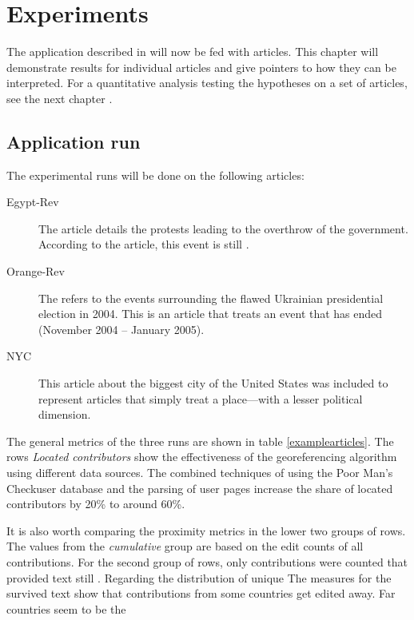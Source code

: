 \chapter{Experiments}\label{ch:experiment}

The application described in  will now be fed with articles. 
This chapter will demonstrate results for individual articles and give pointers to how they can be interpreted.
For a quantitative analysis testing the hypotheses on a set of articles, see the next chapter .

\section{Application run}

The experimental runs will be done on the following articles:

\begin{description}
  \item[Egypt-Rev] The article  details the protests leading to the overthrow of the government.
  According to the article, this event is still .
  \item[Orange-Rev] The  refers to the events surrounding the flawed Ukrainian presidential election in 2004. 
  This is an article that treats an event that has ended (November 2004 -- January 2005).
  \item[NYC] This article about the biggest city of the United States was included to represent articles that simply treat a place---with a lesser political dimension.
\end{description}

The general metrics of the three runs are shown in table \ref{examplearticles}.
The rows \emph{Located contributors} show the effectiveness of the georeferencing algorithm using different data sources.
The combined techniques of using the Poor Man's Checkuser database and the parsing of user pages increase the share of located contributors by 20\% to around 60\%.

It is also worth comparing the proximity metrics in the lower two groups of rows.
The values from the \emph{cumulative} group are based on the edit counts of all contributions.
For the second group of rows, only contributions were counted that provided text still .
Regarding the distribution of unique The measures for the survived text show that contributions from some countries get edited away.
Far countries seem to be the 

